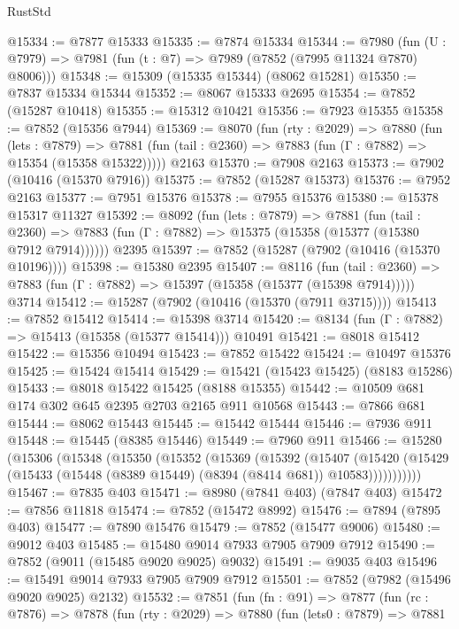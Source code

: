 \begin{lexlean}{RustStd}
\begin{coremodule}
@15334 := @7877 @15333
@15335 := @7874 @15334
@15344 := @7980
    (fun (U : @7979) => @7981 (fun (t : @7) => @7989 (@7852 (@7995 @11324 @7870) @8006)))
@15348 := @15309 (@15335 @15344) (@8062 @15281)
@15350 := @7837 @15334 @15344
@15352 := @8067 @15333 @2695
@15354 := @7852 (@15287 @10418)
@15355 := @15312 @10421
@15356 := @7923 @15355
@15358 := @7852 (@15356 @7944)
@15369 := @8070
    (fun (rty : @2029) =>
    @7880
      (fun (lets : @7879) =>
      @7881 (fun (tail : @2360) => @7883 (fun (Γ : @7882) => @15354 (@15358 @15322)))))
    @2163
@15370 := @7908 @2163
@15373 := @7902 (@10416 (@15370 @7916))
@15375 := @7852 (@15287 @15373)
@15376 := @7952 @2163
@15377 := @7951 @15376
@15378 := @7955 @15376
@15380 := @15378 @15317 @11327
@15392 := @8092
    (fun (lets : @7879) =>
    @7881
      (fun (tail : @2360) =>
      @7883 (fun (Γ : @7882) => @15375 (@15358 (@15377 (@15380 @7912 @7914))))))
    @2395
@15397 := @7852 (@15287 (@7902 (@10416 (@15370 @10196))))
@15398 := @15380 @2395
@15407 := @8116
    (fun (tail : @2360) => @7883 (fun (Γ : @7882) => @15397 (@15358 (@15377 (@15398 @7914)))))
    @3714
@15412 := @15287 (@7902 (@10416 (@15370 (@7911 @3715))))
@15413 := @7852 @15412
@15414 := @15398 @3714
@15420 := @8134 (fun (Γ : @7882) => @15413 (@15358 (@15377 @15414))) @10491
@15421 := @8018 @15412
@15422 := @15356 @10494
@15423 := @7852 @15422
@15424 := @10497 @15376
@15425 := @15424 @15414
@15429 := @15421 (@15423 @15425) (@8183 @15286)
@15433 := @8018 @15422 @15425 (@8188 @15355)
@15442 := @10509 @681 @174 @302 @645 @2395 @2703 @2165 @911 @10568
@15443 := @7866 @681
@15444 := @8062 @15443
@15445 := @15442 @15444
@15446 := @7936 @911
@15448 := @15445 (@8385 @15446)
@15449 := @7960 @911
@15466 := @15280
    (@15306
      (@15348
        (@15350
          (@15352
            (@15369
              (@15392
                (@15407
                  (@15420
                    (@15429 (@15433 (@15448 (@8389 @15449) (@8394 (@8414 @681)) @10583)))))))))))
@15467 := @7835 @403
@15471 := @8980 (@7841 @403) (@7847 @403)
@15472 := @7856 @11818
@15474 := @7852 (@15472 @8992)
@15476 := @7894 (@7895 @403)
@15477 := @7890 @15476
@15479 := @7852 (@15477 @9006)
@15480 := @9012 @403
@15485 := @15480 @9014 @7933 @7905 @7909 @7912
@15490 := @7852 (@9011 (@15485 @9020 @9025) @9032)
@15491 := @9035 @403
@15496 := @15491 @9014 @7933 @7905 @7909 @7912
@15501 := @7852 (@7982 (@15496 @9020 @9025) @2132)
@15532 := @7851
    (fun (fn : @91) =>
    @7877
      (fun (rc : @7876) =>
      @7878
        (fun (rty : @2029) =>
        @7880
          (fun (lets0 : @7879) =>
          @7881

\end{coremodule}
\end{lexlean}
